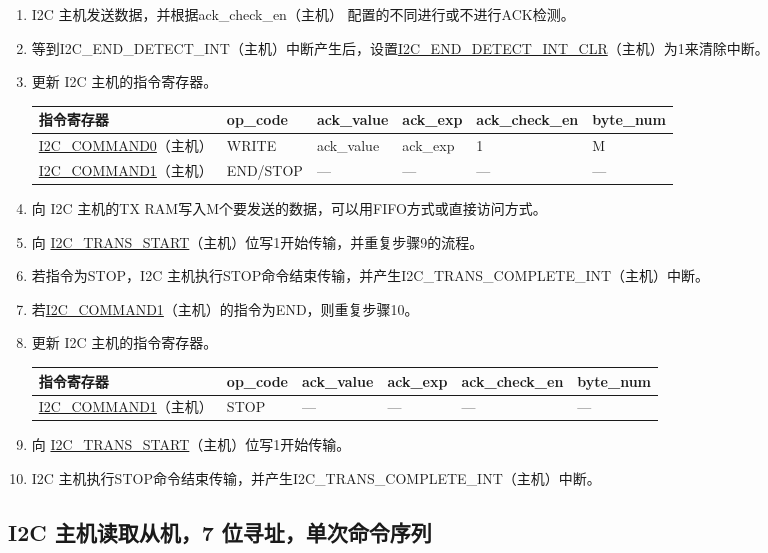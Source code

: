 \documentclass[main\_\_CN.tex]{subfiles}
\begin{document}
\begin{enumerate}
\item I2C 主机发送数据，并根据ack\_check\_en（主机） 配置的不同进行或不进行ACK检测。

\item 等到I2C\_END\_DETECT\_INT（主机）中断产生后，设置\hyperref[fielddesc:I2CENDDETECTINTCLR]{I2C\_END\_DETECT\_INT\_CLR}（主机）为1来清除中断。
\item 更新 I2C 主机的指令寄存器。
\begin{longtable}{ | p{4cm} | p{2cm} | p{2cm} | p{2cm} |p{2cm} | p{2cm} |}
\hline\rowcolor{lightgray}
指令寄存器& op\_code & ack\_value&ack\_exp&ack\_check\_en&byte\_num  \\ \hline
\hyperref[fielddesc:I2CCOMMAND0]{I2C\_COMMAND0}（主机）& WRITE& ack\_value&ack\_exp&1&M  \\ \hline
\hyperref[fielddesc:I2CCOMMAND1]{I2C\_COMMAND1}（主机）& END/STOP& ---&---&---&---  \\ \hline
\end{longtable} 
\item 向 I2C 主机的TX RAM写入M个要发送的数据，可以用FIFO方式或直接访问方式。
\item 向 \hyperref[fielddesc:I2CTRANSSTART]{I2C\_TRANS\_START}（主机）位写1开始传输，并重复步骤9的流程。
\item 若指令为STOP，I2C 主机执行STOP命令结束传输，并产生I2C\_TRANS\_COMPLETE\_INT（主机）中断。
\item 若\hyperref[fielddesc:I2CCOMMAND1]{I2C\_COMMAND1}（主机）的指令为END，则重复步骤10。
\item 更新 I2C 主机的指令寄存器。
\begin{longtable}{ | p{4cm} | p{2cm} | p{2cm} | p{2cm} |p{2cm} | p{2cm} |}
\hline\rowcolor{lightgray}
指令寄存器& op\_code & ack\_value&ack\_exp&ack\_check\_en&byte\_num  \\ \hline
\hyperref[fielddesc:I2CCOMMAND1]{I2C\_COMMAND1}（主机）& STOP& ---&---&---&---  \\ \hline
\end{longtable} 
\item 向 \hyperref[fielddesc:I2CTRANSSTART]{I2C\_TRANS\_START}（主机）位写1开始传输。
\item I2C 主机执行STOP命令结束传输，并产生I2C\_TRANS\_COMPLETE\_INT（主机）中断。

\end{enumerate}



\subsection{I2C 主机读取从机，7 位寻址，单次命令序列}
\end{document}

